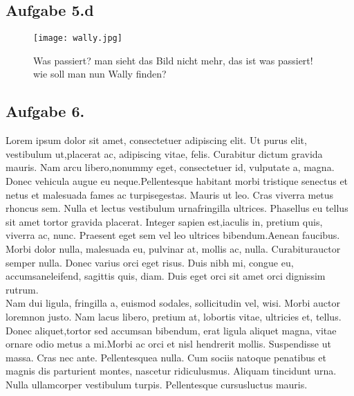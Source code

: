 \documentclass[11pt,
               a4paper,
               parskip=half,
               ]{scrartcl}
\begin{document}
\newpage

\subsection{Aufgabe 5.d}

\begin{figure}[h!]
    \centering
    \texttt{[image: wally.jpg]}
    \caption{Was passiert? man sieht das Bild nicht mehr, das ist was passiert! wie soll man nun Wally finden?}
    \label{Physik}
\end{figure}



 
 \newpage
 \subsection{Aufgabe 6.}
 Lorem ipsum dolor sit amet, consectetuer adipiscing elit. Ut purus elit, vestibulum ut,placerat ac, adipiscing vitae, felis. Curabitur dictum gravida mauris. Nam arcu libero,nonummy eget, consectetuer id, vulputate a, magna. Donec vehicula augue eu neque.Pellentesque habitant morbi tristique senectus et netus et malesuada fames ac turpisegestas. Mauris ut leo. Cras viverra metus rhoncus sem. Nulla et lectus vestibulum urnafringilla ultrices. Phasellus eu tellus sit amet tortor gravida placerat. Integer sapien est,iaculis in, pretium quis, viverra ac, nunc. Praesent eget sem vel leo ultrices bibendum.Aenean faucibus. Morbi dolor nulla, malesuada eu, pulvinar at, mollis ac, nulla. Curabiturauctor semper nulla. Donec varius orci eget risus. Duis nibh mi, congue eu, accumsaneleifend, sagittis quis, diam. Duis eget orci sit amet orci dignissim rutrum.\\
 
 Nam dui ligula, fringilla a, euismod sodales, sollicitudin vel, wisi. Morbi auctor loremnon justo. Nam lacus libero, pretium at, lobortis vitae, ultricies et, tellus. Donec aliquet,tortor sed accumsan bibendum, erat ligula aliquet magna, vitae ornare odio metus a mi.Morbi ac orci et nisl hendrerit mollis. Suspendisse ut massa. Cras nec ante. Pellentesquea nulla. Cum sociis natoque penatibus et magnis dis parturient montes, nascetur ridiculusmus. Aliquam tincidunt urna. Nulla ullamcorper vestibulum turpis. Pellentesque cursusluctus mauris.\\
 
\end{document}
